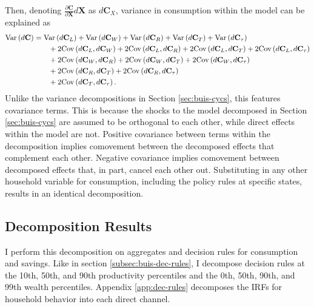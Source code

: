 Then, denoting $\frac{\partial \mathbf{C}}{\partial \mathbf{X}} d \mathbf{X}$ as $d \mathbf{C}_X$, variance in consumption within the model can be explained as
\begin{align*}
    \mathrm{Var}\left(d \mathbf{C}\right) &= \mathrm{Var}\left(d \mathbf{C}_L\right) + \mathrm{Var}\left(d \mathbf{C}_W\right) + \mathrm{Var}\left(d \mathbf{C}_R\right) + \mathrm{Var}\left(d \mathbf{C}_T\right) + \mathrm{Var}\left(d \mathbf{C}_\tau\right) \\
    & \quad\quad + 2 \mathrm{Cov} \left(d \mathbf{C}_L, d \mathbf{C}_W\right) + 2 \mathrm{Cov} \left(d \mathbf{C}_L, d \mathbf{C}_R\right) + 2 \mathrm{Cov} \left(d \mathbf{C}_L, d \mathbf{C}_T\right) + 2 \mathrm{Cov} \left(d \mathbf{C}_L, d \mathbf{C}_\tau\right) \\
    & \quad\quad + 2 \mathrm{Cov} \left(d \mathbf{C}_W, d \mathbf{C}_R\right) + 2 \mathrm{Cov} \left(d \mathbf{C}_W, d \mathbf{C}_T\right) + 2 \mathrm{Cov} \left(d \mathbf{C}_W, d \mathbf{C}_\tau\right) \\
    & \quad\quad + 2 \mathrm{Cov} \left(d \mathbf{C}_R, d \mathbf{C}_T\right) + 2 \mathrm{Cov} \left(d \mathbf{C}_R, d \mathbf{C}_\tau\right) \\
    & \quad\quad + 2 \mathrm{Cov} \left(d \mathbf{C}_T, d \mathbf{C}_\tau\right).
\end{align*}
Unlike the variance decompositions in Section \ref{sec:buis-cycs}, this features covariance terms. This is because the shocks to the model decomposed in Section \ref{sec:buis-cycs} are assumed to be orthogonal to each other, while direct effects within the model are not. Positive covariance between terms within the decomposition implies comovement between the decomposed effects that complement each other. Negative covariance implies comovement between decomposed effects that, in part, cancel each other out. Substituting in any other household variable for consumption, including the policy rules at specific states, results in an identical decomposition. 


\subsection{Decomposition Results}

I perform this decomposition on aggregates and decision rules for consumption and savings. Like in section \ref{subsec:buis-dec-rules}, I decompose decision rules at the 10th, 50th, and 90th productivity percentiles and the 0th, 50th, 90th, and 99th wealth percentiles. Appendix \ref{app:dec-rules} decomposes the IRFs for household behavior into each direct channel.

